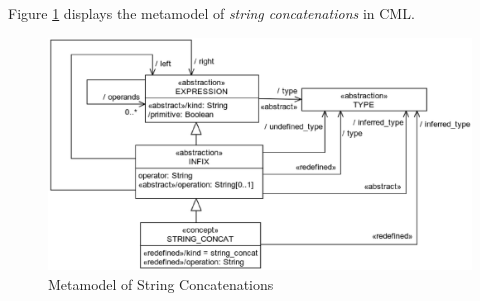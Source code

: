 Figure \ref{fig:meta:str-concat} displays the metamodel of
\emph{string concatenations} in CML.

\begin{figure}[H]
\centering
\includegraphics[width=1.2\textwidth]{metamodel/str-concat}
\caption{Metamodel of String Concatenations}
\label{fig:meta:str-concat}
\end{figure}
